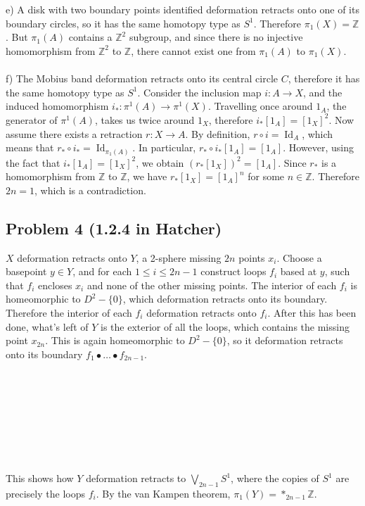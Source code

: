 \documentclass[12 pt]{article}
\newcommand{\Z}{\mathbb{Z}}
\DeclareMathOperator{\id}{Id}
\begin{document}
\\
\\
e) A disk with two boundary points identified deformation retracts onto one of its boundary circles, so it has the same homotopy type as $S^1$. Therefore $\pi_1(X) = \Z$. But $\pi_1(A)$ contains a $\Z^2$ subgroup, and since there is no injective homomorphism from $\Z^2$ to $\Z$, there cannot exist one from $\pi_1(A)$ to $\pi_1(X)$.
\\
\\
f) The Mobius band deformation retracts onto its central circle $C$, therefore it has the same homotopy type as $S^1$. Consider the inclusion map $i : A \to X$, and the induced homomorphism $i_* : \pi^1(A) \to \pi^1(X)$. Travelling once around $1_A$, the generator of $\pi^1(A)$, takes us twice around $1_X$, therefore $i_* [1_A] =  [1_X]^2$. Now assume there exists a retraction $r : X \to A$. By definition, $r \circ i = \id_A$, which means that $r_* \circ i_* = \id_{\pi_1(A)}$. In particular, $r_* \circ i_* [1_A] = [1_A]$. However, using the fact that $i_* [1_A] =  [1_X]^2$, we obtain $(r_*[1_X])^2 = [1_A]$. Since $r_*$ is a homomorphism from $\Z$ to $\Z$, we have $r_*[1_X] = [1_A]^n$ for some $n\in \Z$. Therefore $2n = 1$, which is a contradiction.


\subsection*{Problem 4 (1.2.4 in Hatcher)}
$X$ deformation retracts onto $Y$, a 2-sphere missing $2n$ points $x_i$. Choose a basepoint $y \in Y$, and for each $1 \leq i \leq 2n-1$ construct loops $f_i$ based at $y$, such that $f_i$ encloses $x_i$ and none of the other missing points. The interior of each $f_i$ is homeomorphic to $D^2 - \{0\}$, which deformation retracts onto its boundary. Therefore the interior of each $f_i$ deformation retracts onto $f_i$. After this has been done, what's left of $Y$ is the exterior of all the loops, which contains the missing point $x_{2n}$. This is again homeomorphic to $D^2 - \{0\}$, so it deformation retracts onto its boundary $f_1 \bullet \dots \bullet f_{2n-1}$. 
\\
\\
\\
\\
\\
\\
\\
\\
\\
This shows how $Y$ deformation retracts to $\bigvee_{2n-1} S^1$, where the copies of $S^1$ are precisely the loops $f_i$. By the van Kampen theorem, $\pi_1(Y) = *_{2n-1} \Z$.
\end{document}
